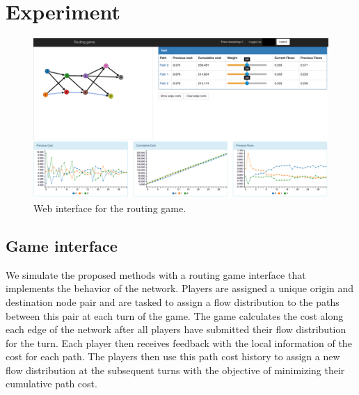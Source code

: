\documentclass{sig-alternate-ipsn13}
\begin{document}
\section{Experiment}
\label{sec:experiment}

\begin{figure}
  \centering
  \includegraphics[width=160mm]{images/user_interface}
  \caption{Web interface for the routing game.}
  \label{fig:web_interface}
\end{figure}
\subsection{Game interface}


We simulate the proposed methods with a routing game interface that implements the behavior of the network. Players are assigned a unique origin and destination node pair and are tasked to assign a flow distribution to the paths between this pair at each turn of the game. The game calculates the cost along each edge of the network after all players have submitted their flow distribution for the turn. Each player then receives feedback with the local information of the cost for each path. The players then use this path cost history to assign a new flow distribution at the subsequent turns with the objective of minimizing their cumulative path cost.


\end{document}
